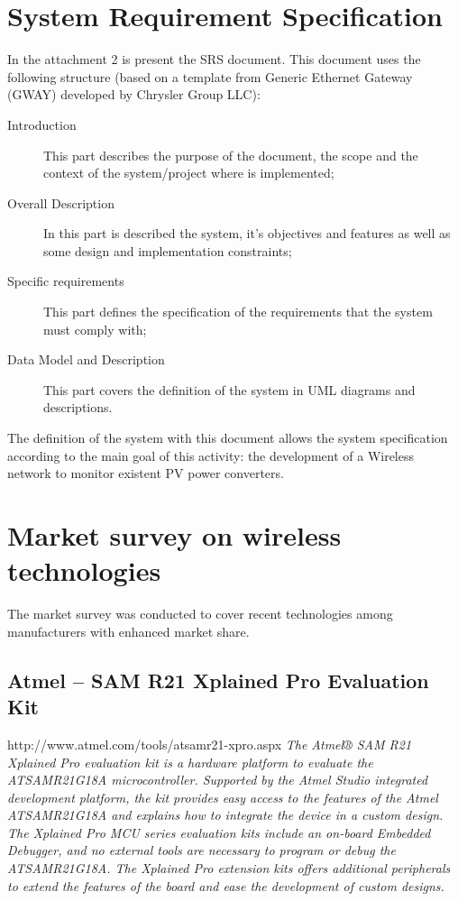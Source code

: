 \section{System Requirement Specification}
In the attachment 2 is present the SRS document. This document uses the following structure (based on a template from Generic Ethernet Gateway (GWAY) developed by Chrysler Group LLC):
\begin{description}
	\item[Introduction] This part describes the purpose of the document, the scope and the context of the system/project where is implemented;
	
	\item[Overall Description] In this part is described the system, it's objectives and features as well as some design and implementation constraints;
	
	\item[Specific requirements] This part defines the specification of the requirements that the system must comply with;
	
	\item[Data Model and Description] This part covers the definition of the system in UML diagrams and descriptions.
			
\end{description}

The definition of the system with this document allows the system specification according to the main goal of this activity: the development of a Wireless network to monitor existent PV power converters.

\section{Market	survey on wireless technologies}
The market survey was conducted to cover recent technologies among manufacturers with enhanced market share.

\subsection{Atmel -- SAM R21 Xplained Pro Evaluation Kit}



\begin{framed}

	http://www.atmel.com/tools/atsamr21-xpro.aspx
\vspace{1em}
\vspace{1em}
\small
\textit{The Atmel® SAM R21 Xplained Pro evaluation kit is a hardware platform to evaluate the ATSAMR21G18A microcontroller. Supported by the Atmel Studio integrated development platform, the kit provides easy access to the features of the Atmel ATSAMR21G18A and explains how to integrate the device in a custom design. The Xplained Pro MCU series evaluation kits include an on-board Embedded Debugger, and no external tools are necessary to program or debug the ATSAMR21G18A. The Xplained Pro extension kits offers additional peripherals to extend the features of the board and ease the development of custom designs.}
\end{framed}

